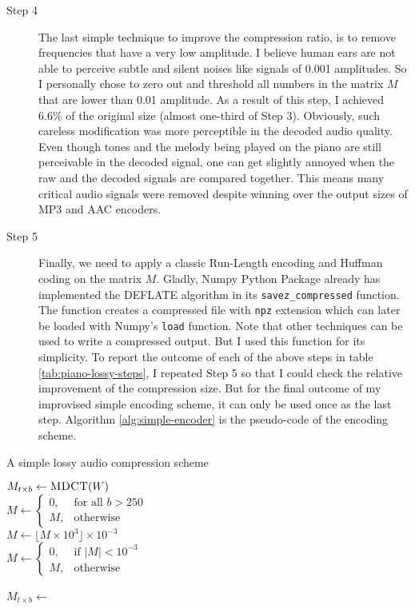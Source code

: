 \begin{description}
    \item[Step 4] The last simple technique to improve the compression ratio, is to remove frequencies that have a very low amplitude. I believe human ears are not able to perceive subtle and silent noises like signals of 0.001 amplitudes. So I personally chose to zero out and threshold all numbers in the matrix $M$ that are lower than 0.01 amplitude. As a result of this step, I achieved 6.6\% of the original size (almost one-third of Step 3). Obviously, such careless modification was more perceptible in the decoded audio quality. Even though tones and the melody being played on the piano are still perceivable in the decoded signal, one can get slightly annoyed when the raw and the decoded signals are compared together. This means many critical audio signals were removed despite winning over the output sizes of MP3 and AAC encoders.
    
    \item[Step 5] Finally, we need to apply a classic Run-Length encoding and Huffman coding on the matrix $M$. Gladly, Numpy Python Package\cite{harris2020array} already has implemented the DEFLATE algorithm in its \verb|savez_compressed| function. The function creates a compressed file with \verb|npz| extension which can later be loaded with Numpy's \verb|load| function. Note that other techniques can be used to write a compressed output. But I used this function for its simplicity. To report the outcome of each of the above steps in table \ref{tab:piano-lossy-steps}, I repeated Step 5 so that I could check the relative improvement of the compression size. But for the final outcome of my improvised simple encoding scheme, it can only be used once as the last step. Algorithm \ref{alg:simple-encoder} is the pseudo-code of the encoding scheme.
\end{description}

\begin{algorithm}
\caption{A simple lossy audio compression scheme}\label{alg:simple-encoder}
\begin{algorithmic}
\State $M_{t \times b} \gets \Call{MDCT}{W}$ 
\\
\State $M \gets \begin{cases}
0 , & \text{for all $b>250$} \\
M , & \text{otherwise}
\end{cases}$ 
\\
\State $M \gets \lfloor M \times 10^3 \rfloor \times 10^{-3}$ 
\\
\State $M \gets \begin{cases}
0 , & \text{if $|M|<10^{-3}$} \\
M , & \text{otherwise}
\end{cases}$ 
\\
\State \Return {}
\EndFunction
\\
\State $M_{t \times b} \gets$ 
\State \Return {}
\EndFunction
\end{algorithmic}
\end{algorithm}

